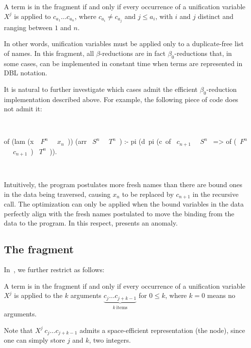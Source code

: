 \documentclass[a4paper, 11pt]{book}
\newenvironment{elpicode}
  {\VerbatimEnvironment~\\\begin{elpibox}\begin{xelpicode}}{\end{xelpicode}
\end{elpibox}\\}
\begin{document}
\begin{definition}
A term is in the \theotherfragment fragment if and only if every occurrence of
a unification variable $X^j$ is applied to $c_{a_1} \ldots c_{a_n}$, where
$c_{a_i} \neq c_{a_j}$ and $j \leq a_i$, with $i$ and $j$
distinct and ranging between $1$ and $n$.
\end{definition}

\noindent
In other words, unification variables must be applied only to a duplicate-free
list of names. In this fragment, all $\beta$-reductions are in fact
$\beta_0$-reductions that, in some cases, can be implemented in constant time
when terms are represented in DBL notation.


It is natural to further investigate which cases admit the efficient
$\beta_0$-reduction implementation described above. For example, the following
piece of code does not admit it:

\begin{elpicode}
of (lam (x\ ~$F^n$~ ~$x_n$~)) (arr ~$S^n$~ ~$T^n$~) :-
  pi (d\ pi (c\ of ~$c_{n+1}$~ ~$S^n$~ => of (~$F^n$~ ~$c_{n+1}$~) ~$T^n$~)).
\end{elpicode}

\noindent
Intuitively, the program postulates more fresh names than there are bound ones
in the data being traversed, causing $x_n$ to be replaced by $c_{n+1}$ in the
recursive call. The optimization can only be applied when the bound variables
in the data perfectly align with the fresh names postulated to move the binding
from the data to the program. In this respect, 
presents an anomaly.

\subsection{The \thefragment fragment}\label{sec:llambo}


In~\cite{dunchev15lpar}, we further restrict \theotherfragment as follows:


\begin{definition}
A term is in the fragment \thefragment if and only if every
occurrence of a unification variable $X^j$ is applied to the $k$ arguments
$\underbrace{c_j \ldots c_{j + k-1}}_{k~\mathrm{items}}$ for $0 \leq k$,
where $k=0$ means no arguments.
\end{definition}


Note that $X^j\ c_j \ldots c_{j + k-1}$ admits a space-efficient
representation (the  node), since one can simply store $j$ and
$k$, two integers.
\end{document}
